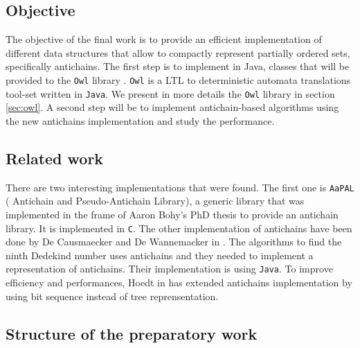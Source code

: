 \documentclass[letterpaper]{article}
\theoremstyle{definition}
\begin{document}

\subsection{Objective}

The objective of the final work
is to provide an efficient implementation of different
data structures that allow to compactly
represent partially ordered sets, specifically antichains.
The first step is to implement in Java, classes that will be provided to
the \texttt{Owl} library \cite{owl}.
\texttt{Owl} is a LTL to deterministic automata translations tool-set written
in \texttt{Java}. We present in more details
the \texttt{Owl} library in section \ref{sec:owl}.
A second step will be to implement
antichain-based algorithms using the new antichains implementation and
study the performance.

\subsection{Related work}

There are two interesting implementations that were found.
The first one is \texttt{AaPAL} (
Antichain and Pseudo-Antichain Library), a generic
library that was implemented in the frame of
Aaron Bohy's PhD thesis \cite{bohy_phd}
to provide an antichain library. It is implemented in \texttt{C}.
The other implementation of antichains
have been done
by De Causmaecker and De Wannemacker in \cite{causemaecker1}. The algorithms
to find the ninth Dedekind number uses antichains and they needed to
implement a representation of antichains. Their implementation is using
\texttt{Java}.
To improve efficiency and performances, Hoedt in \cite{hoedt} has extended
\cite{causemaecker1} antichains implementation by using bit sequence
instead of tree reprensentation.

\subsection{Structure of the preparatory work}
\end{document}
